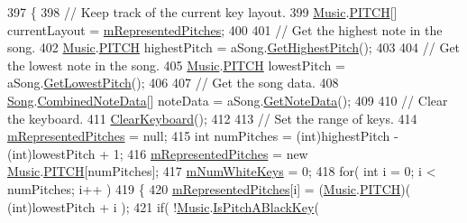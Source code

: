 \begin{DoxyCode}
397     \{
398         \textcolor{comment}{// Keep track of the current key layout.}
399         \hyperlink{class_music}{Music}.\hyperlink{group___music_enums_ga508f69b199ea518f935486c990edac1d}{PITCH}[] currentLayout = \hyperlink{group___key_contain_priv_var_ga103945a6efe3469191e5253d13fec5be}{mRepresentedPitches};
400 
401         \textcolor{comment}{// Get the highest note in the song.}
402         \hyperlink{class_music}{Music}.\hyperlink{group___music_enums_ga508f69b199ea518f935486c990edac1d}{PITCH} highestPitch = aSong.\hyperlink{group___song_pub_func_gafaa104e8653edf64148260ecd400570f}{GetHighestPitch}();
403 
404         \textcolor{comment}{// Get the lowest note in the song.}
405         \hyperlink{class_music}{Music}.\hyperlink{group___music_enums_ga508f69b199ea518f935486c990edac1d}{PITCH} lowestPitch = aSong.\hyperlink{group___song_pub_func_gae4e71c8eb059cc9cf0b77e78971ab326}{GetLowestPitch}();
406 
407         \textcolor{comment}{// Get the song data.}
408         \hyperlink{class_song}{Song}.\hyperlink{group___song_structs_struct_song_1_1_combined_note_data}{CombinedNoteData}[] noteData = aSong.\hyperlink{group___song_pub_func_gae3df1fd5448b7d9cefb0fed4af967985}{GetNoteData}();
409 
410         \textcolor{comment}{// Clear the keyboard.}
411         \hyperlink{group___key_contain_priv_func_ga679f5ca9d6b1505180e90ee00bbfe616}{ClearKeyboard}();
412 
413         \textcolor{comment}{// Set the range of keys.}
414         \hyperlink{group___key_contain_priv_var_ga103945a6efe3469191e5253d13fec5be}{mRepresentedPitches} = null;
415         \textcolor{keywordtype}{int} numPitches = (int)highestPitch - (\textcolor{keywordtype}{int})lowestPitch + 1;
416         \hyperlink{group___key_contain_priv_var_ga103945a6efe3469191e5253d13fec5be}{mRepresentedPitches} = \textcolor{keyword}{new} \hyperlink{class_music}{Music}.\hyperlink{group___music_enums_ga508f69b199ea518f935486c990edac1d}{PITCH}[numPitches];
417         \hyperlink{group___key_contain_priv_var_ga7a5547a1fe5c40eac487fe6c826c8f9c}{mNumWhiteKeys} = 0;
418         \textcolor{keywordflow}{for}( \textcolor{keywordtype}{int} i = 0; i < numPitches; i++ )
419         \{
420             \hyperlink{group___key_contain_priv_var_ga103945a6efe3469191e5253d13fec5be}{mRepresentedPitches}[i] = (\hyperlink{class_music}{Music}.\hyperlink{group___music_enums_ga508f69b199ea518f935486c990edac1d}{PITCH})( (\textcolor{keywordtype}{int})lowestPitch + i );
421             \textcolor{keywordflow}{if}( !\hyperlink{class_music}{Music}.\hyperlink{group___music_stat_func_gacc2c1a66df7197225f61c5737f794065}{IsPitchABlackKey}( 

\end{DoxyCode}
